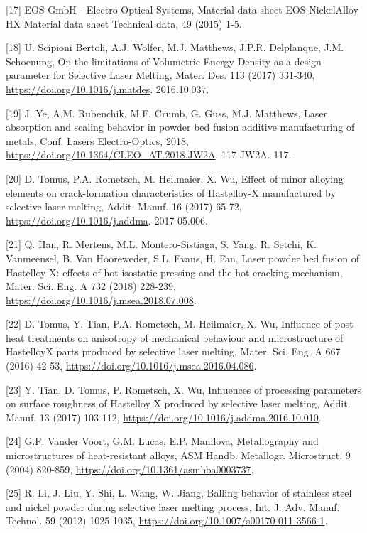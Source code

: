 \documentclass[10pt]{article}
\begin{document}
[17] EOS GmbH - Electro Optical Systems, Material data sheet EOS NickelAlloy HX Material data sheet Technical data, 49 (2015) 1-5.

[18] U. Scipioni Bertoli, A.J. Wolfer, M.J. Matthews, J.P.R. Delplanque, J.M. Schoenung, On the limitations of Volumetric Energy Density as a design parameter for Selective Laser Melting, Mater. Des. 113 (2017) 331-340, \href{https://doi.org/10.1016/j.matdes}{https://doi.org/10.1016/j.matdes}. 2016.10.037.

[19] J. Ye, A.M. Rubenchik, M.F. Crumb, G. Guss, M.J. Matthews, Laser absorption and scaling behavior in powder bed fusion additive manufacturing of metals, Conf. Lasers Electro-Optics, 2018, \href{https://doi.org/10.1364/CLEO_AT.2018.JW2A}{https://doi.org/10.1364/CLEO\_AT.2018.JW2A}. 117 JW2A. 117.

[20] D. Tomus, P.A. Rometsch, M. Heilmaier, X. Wu, Effect of minor alloying elements on crack-formation characteristics of Hastelloy-X manufactured by selective laser melting, Addit. Manuf. 16 (2017) 65-72, \href{https://doi.org/10.1016/j.addma}{https://doi.org/10.1016/j.addma}. 2017 05.006.

[21] Q. Han, R. Mertens, M.L. Montero-Sistiaga, S. Yang, R. Setchi, K. Vanmeensel, B. Van Hooreweder, S.L. Evans, H. Fan, Laser powder bed fusion of Hastelloy X: effects of hot isostatic pressing and the hot cracking mechanism, Mater. Sci. Eng. A 732 (2018) 228-239, \href{https://doi.org/10.1016/j.msea.2018.07.008}{https://doi.org/10.1016/j.msea.2018.07.008}.

[22] D. Tomus, Y. Tian, P.A. Rometsch, M. Heilmaier, X. Wu, Influence of post heat treatments on anisotropy of mechanical behaviour and microstructure of HastelloyX parts produced by selective laser melting, Mater. Sci. Eng. A 667 (2016) 42-53, \href{https://doi.org/10.1016/j.msea.2016.04.086}{https://doi.org/10.1016/j.msea.2016.04.086}.

[23] Y. Tian, D. Tomus, P. Rometsch, X. Wu, Influences of processing parameters on surface roughness of Hastelloy X produced by selective laser melting, Addit. Manuf. 13 (2017) 103-112, \href{https://doi.org/10.1016/j.addma.2016.10.010}{https://doi.org/10.1016/j.addma.2016.10.010}.

[24] G.F. Vander Voort, G.M. Lucas, E.P. Manilova, Metallography and microstructures of heat-resistant alloys, ASM Handb. Metallogr. Microstruct. 9 (2004) 820-859, \href{https://doi.org/10.1361/asmhba0003737}{https://doi.org/10.1361/asmhba0003737}.

[25] R. Li, J. Liu, Y. Shi, L. Wang, W. Jiang, Balling behavior of stainless steel and nickel powder during selective laser melting process, Int. J. Adv. Manuf. Technol. 59 (2012) 1025-1035, \href{https://doi.org/10.1007/s00170-011-3566-1}{https://doi.org/10.1007/s00170-011-3566-1}.
\end{document}
